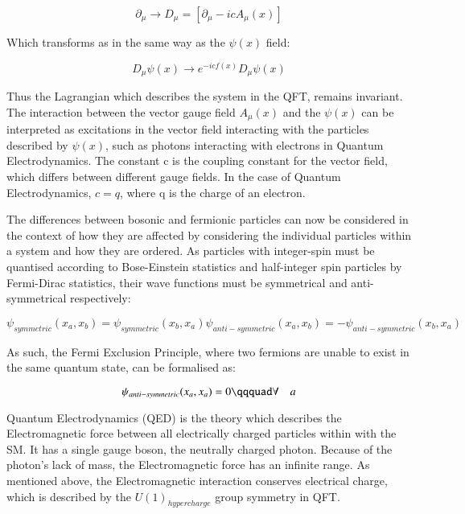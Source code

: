 \begin{equation}
\partial_{\mu} \rightarrow D_{\mu} = [ \partial_{\mu} - icA_{\mu}(x) ]
\end{equation}

Which transforms as in the same way as the $\psi(x)$ field:

\begin{equation}
D_{\mu}\psi(x) \rightarrow e^{-icf(x)}D_{\mu}\psi(x)
\end{equation}

Thus the Lagrangian which describes the system in the QFT, remains invariant. 
The interaction between the vector gauge field $A_{\mu}(x)$ and the $\psi(x)$ can be interpreted as excitations in the vector field interacting with the particles described by $\psi(x)$, such as photons interacting with electrons in Quantum Electrodynamics. 
The constant c is the coupling constant for the vector field, which differs between different gauge fields. 
In the case of Quantum Electrodynamics, $c = q$, where q is the charge of an electron.

The differences between bosonic and fermionic particles can now be considered in the context of how they are affected by considering the individual particles within a system and how they are ordered. 
As particles with integer-spin must be quantised according to Bose-Einstein statistics and half-integer spin particles by Fermi-Dirac statistics, their wave functions must be symmetrical and anti-symmetrical respectively:

\begin{equation}
\psi_{symmetric}(x_{a},x_{b}) = \psi_{symmetric}(x_{b},x_{a})
\psi_{anti-symmetric}(x_{a},x_{b}) = -\psi_{anti-symmetric}(x_{b},x_{a})
\end{equation}

As such, the Fermi Exclusion Principle, where two fermions are unable to exist in the same quantum state, can be formalised as:

\begin{equation}
\psi_{anti-symmetric}(x_{a},x_{a}) = 0 \qqquad \forall \quad a
\end{equation}

Quantum Electrodynamics (QED) is the theory which describes the Electromagnetic force between all electrically charged particles within with the SM. 
It has a single gauge boson, the neutrally charged photon. 
Because of the photon’s lack of mass, the Electromagnetic force has an infinite range. 
As mentioned above, the Electromagnetic interaction conserves electrical charge, which is described by the $U(1)_{hypercharge}$ group symmetry in QFT. 

